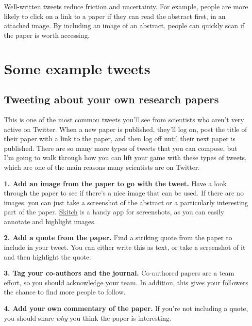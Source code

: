 \documentclass[]{book}
\begin{document}
Well-written tweets reduce friction and uncertainty. For example, people are more likely to click on a link to a paper if they can read the abstract first, in an attached image. By including an image of an abstract, people can quickly scan if the paper is worth accessing.

\hypertarget{some-example-tweets}{%
\section{Some example tweets}\label{some-example-tweets}}

\hypertarget{tweeting-about-your-own-research-papers}{%
\subsection{Tweeting about your own research papers}\label{tweeting-about-your-own-research-papers}}

This is one of the most common tweets you'll see from scientists who aren't very active on Twitter. When a new paper is published, they'll log on, post the title of their paper with a link to the paper, and then log off until their next paper is published. There are so many more types of tweets that you can compose, but I'm going to walk through how you can lift your game with these types of tweets, which are one of the main reasons many scientists are on Twitter.

\textbf{1. Add an image from the paper to go with the tweet.} Have a look through the paper to see if there's a nice image that can be used. If there are no images, you can just take a screenshot of the abstract or a particularly interesting part of the paper. \href{https://evernote.com/products/skitch}{Skitch} is a handy app for screenshots, as you can easily annotate and highlight images.

\textbf{2. Add a quote from the paper.} Find a striking quote from the paper to include in your tweet. You can either write this as text, or take a screenshot of it and then highlight the quote.

\textbf{3. Tag your co-authors and the journal.} Co-authored papers are a team effort, so you should acknowledge your team. In addition, this gives your followers the chance to find more people to follow.

\textbf{4. Add your own commentary of the paper.} If you're not including a quote, you should share \emph{why} you think the paper is interesting.
\end{document}
